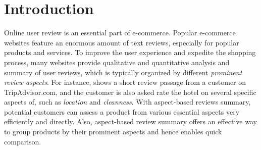 \section{Introduction}
\label{sec:intro}
Online user review is an essential part of e-commerce. 
Popular e-commerce websites feature an enormous amount of text reviews, 
especially for popular products and services. 
To improve the user experience and expedite the
shopping process, many websites provide qualitative and quantitative
analysis and summary of user reviews, which is typically organized by different 
{\em prominent review aspects}.
For instance,  shows a short review passage from a customer on TripAdvisor.com, and the customer is also asked
rate the hotel on several specific aspects of, 
such as \textit{location} and \textit{cleanness}. 
%
With aspect-based reviews summary, potential customers can 
assess a product from various essential aspects very efficiently and directly.
Also, aspect-based review summary offers an effective 
way to group products by their prominent aspects and hence
enables quick comparison.

